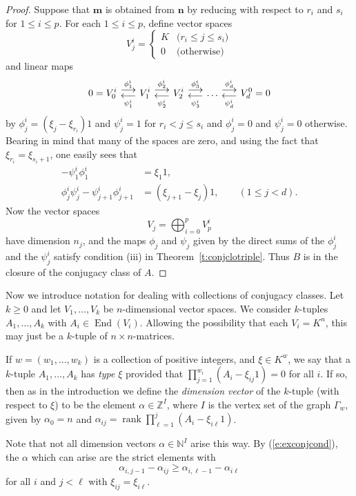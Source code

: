 \documentclass{amsart}
\theoremstyle{plain}
\theoremstyle{definition}
\theoremstyle{remark}
\newcommand{\Z}{\mathbb{Z}}
\newcommand{\N}{\mathbb{N}}
\DeclareMathOperator{\End}{End}
\DeclareMathOperator{\rank}{rank}
\DeclareMathOperator*{\rightoverleft}{\parbox{2em}{\centerline{$\longrightarrow$}\vskip -6pt\centerline{$\longleftarrow$}}}
\begin{document}
\begin{proof}
Suppose that $\mathbf{m}$ is obtained from $\mathbf{n}$ by reducing with respect to $r_i$ and $s_i$
for $1\le i\le p$. For each $1\le i\le p$, define vector spaces
\[
V^i_j = \begin{cases}
K & \text{($r_i \le j \le s_i$)} \\
0 & \text{(otherwise)}
\end{cases}
\]
and linear maps
\[
0=V^i_0 \rightoverleft^{\phi^i_{1}}_{\psi^i_{1}} V^i_{1} \rightoverleft^{\phi^i_{2}}_{\psi^i_{2}} V^i_{2}
\rightoverleft^{\phi^i_{3}}_{\psi^i_{3}} \dots
\rightoverleft^{\phi^i_{d}}_{\psi^i_{d}} V^0_{d}=0
\]
by $\phi^i_j = (\xi_j - \xi_{r_i}) 1$ and $\psi^i_j = 1$ for $r_i< j\le s_i$ and
$\phi^i_j = 0$ and $\psi^i_j=0$ otherwise.
Bearing in mind that many of the spaces are zero, and
using the fact that $\xi_{r_i} = \xi_{s_i+1}$, one easily sees that
\[
\begin{split}
 - \psi^i_{1} \phi^i_{1}
&= \xi_{1} 1,
\\
\phi^i_{j} \psi^i_{j} - \psi^i_{j+1}\phi^i_{j+1}
&= (\xi_{j+1}-\xi_{j}) 1,
\qquad (1\le j < d).
\end{split}
\]
Now the vector spaces
\[
V_j = \bigoplus_{i=0}^p V^i_p
\]
have dimension $n_j$, and the maps $\phi_j$ and $\psi_j$ given by the direct sums of the $\phi^i_j$ and
the $\psi^i_j$ satisfy condition (iii) in Theorem~\ref{t:conjclotriple}. Thus $B$ is in
the closure of the conjugacy class of $A$.
\end{proof}


Now we introduce notation for dealing with collections of conjugacy classes.
Let $k\ge 0$ and let $V_1,\dots,V_k$ be $n$-dimensional vector spaces.
We consider $k$-tuples $A_1,\dots,A_k$ with $A_i\in\End(V_i)$.
Allowing the possibility that each $V_i=K^n$, this may just be a
$k$-tuple of $n\times n$-matrices.

If $w=(w_1,\dots,w_k)$ is a collection of positive integers,
and $\xi\in K^w$, we say that a $k$-tuple $A_1,\dots,A_k$ has \emph{type} $\xi$
provided that $\prod_{j=1}^{w_i}(A_i-\xi_{ij}1)=0$ for all $i$. If so, then as in the
introduction we define the \emph{dimension vector} of the $k$-tuple
(with respect to $\xi$) to be the element $\alpha\in\Z^I$, where $I$ is the
vertex set of the graph $\Gamma_w$, given by $\alpha_0 = n$ and
$\alpha_{ij}=\rank \prod_{\ell=1}^j (A_i - \xi_{i\ell}1)$.

Note that not all dimension vectors $\alpha\in\N^I$ arise this way.
By (\ref{e:exconjcond}), the $\alpha$ which can arise are the strict
elements with
%
\begin{equation}
\label{e:conjdimveccond}
\alpha_{i,j-1}-\alpha_{ij} \ge \alpha_{i,\ell-1}-\alpha_{i\ell}
\end{equation}
%
for all $i$ and $j<\ell$ with $\xi_{ij}=\xi_{i\ell}$.
\end{document}
